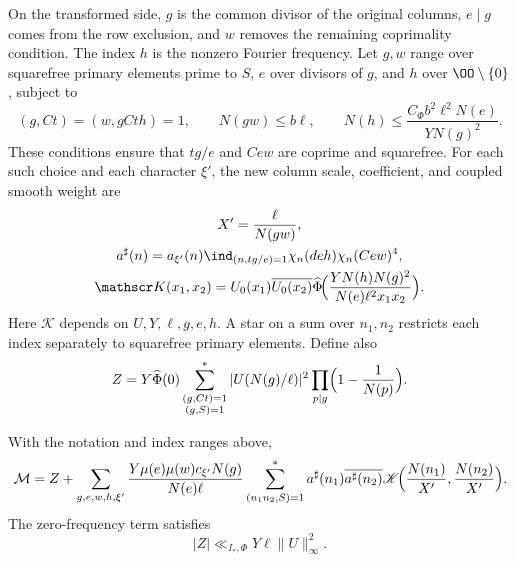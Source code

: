 On the transformed side, $g$ is the common divisor of the original
columns, $e\mid g$ comes from the row exclusion, and $w$ removes the
remaining coprimality condition. The index $h$ is the nonzero Fourier
frequency. Let $g,w$ range over squarefree primary elements prime to $S$,
$e$ over divisors of $g$, and $h$ over $\OO\setminus\{0\}$, subject to
\[
 (g,Ct)=(w,gCth)=1,\qquad
 N(gw)\le b\ell,\qquad
 N(h)\le\frac{C_\Phi b^2\ell^2N(e)}{YN(g)^2}.
\]
These conditions ensure that $tg/e$ and $Cew$ are coprime and squarefree.
For each such choice and each character $\xi'$, the new column scale,
coefficient, and coupled smooth weight are
\begin{equation}\label{eq:common-poisson-output}
 \begin{gathered}
 X'=\frac{\ell}{N(gw)},\\
 a^\sharp(n)=a_{\xi'}(n)\ind_{(n,tg/e)=1}
                   \chi_n(deh)\chi_n(Cew)^4,\\
 \mathscr K(x_1,x_2)=U_0(x_1)\overline{U_0(x_2)}
               \widehat\Phi\!\Bigl(\frac{YN(h)N(g)^2}{N(e)\ell^2x_1x_2}\Bigr).
 \end{gathered}
\end{equation}
Here $\mathscr K$ depends on $U,Y,\ell,g,e,h$. A star on a sum over
$n_1,n_2$ restricts each index separately to squarefree primary elements.
Define also
\[
 Z=Y\widehat\Phi(0)
 \sum_{\substack{(g,Ct)=1\\(g,S)=1}}^*
 |U(N(g)/\ell)|^2\prod_{p\mid g}\Bigl(1-\frac1{N(p)}\Bigr).
\]


\begin{lemma}\label{lem:arithmetic-poisson}
With the notation and index ranges above,
\begin{equation}\label{eq:arithmetic-poisson-identity}
 \mathcal M=Z+
 \sum_{g,e,w,h,\xi'}\frac{Y\mu(e)\mu(w)c_{\xi'}N(g)}{N(e)\ell} \sum_{(n_1n_2,S)=1}^*a^\sharp(n_1)\overline{a^\sharp(n_2)}
       \mathscr K\!\Bigl(\frac{N(n_1)}{X'},\frac{N(n_2)}{X'}\Bigr).
\end{equation}
The zero-frequency term satisfies
\[
 |Z|\ll_{I_*,\Phi}Y\ell\|U\|_\infty^2.
\]
\end{lemma}

